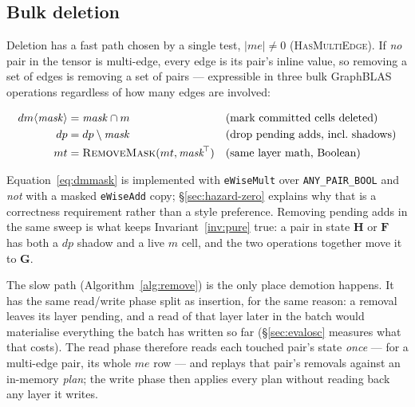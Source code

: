\documentclass[11pt,a4paper]{article}
\theoremstyle{plain}
\theoremstyle{definition}
\theoremstyle{remark}
\begin{document}
\subsection{Bulk deletion}
\label{sec:delete}

Deletion has a fast path chosen by a single test, $|me| \neq 0$
(\textsc{HasMultiEdge}). If \emph{no} pair in the tensor is multi-edge, every
edge is its pair's inline value, so removing a set of edges is removing a set
of pairs --- expressible in three bulk GraphBLAS operations regardless of how
many edges are involved:

\begin{align}
  dm\langle \mathit{mask}\rangle &\mathrel{{=}} \mathit{mask} \cap m
    &&\text{(mark committed cells deleted)} \label{eq:dmmask}\\
  dp &\mathrel{{=}} dp \setminus \mathit{mask}
    &&\text{(drop pending adds, incl.\ shadows)} \notag\\
  mt &\mathrel{{=}} \text{\textsc{RemoveMask}}(mt, \mathit{mask}^{\!\top})
    &&\text{(same layer math, Boolean)} \notag
\end{align}

Equation~\eqref{eq:dmmask} is implemented with \texttt{eWiseMult} over
\texttt{ANY\_PAIR\_BOOL} and \emph{not} with a masked \texttt{eWiseAdd} copy;
\S\ref{sec:hazard-zero} explains why that is a correctness requirement rather
than a style preference. Removing pending adds in the same sweep is what
keeps Invariant~\ref{inv:pure} true: a pair in state $\mathbf{H}$ or
$\mathbf{F}$ has both a $dp$ shadow and a live $m$ cell, and the two
operations together move it to $\mathbf{G}$.

The slow path (Algorithm~\ref{alg:remove}) is the only place demotion happens.
It has the same read/write phase split as insertion, for the same reason: a
removal leaves its layer pending, and a read of that layer later in the batch
would materialise everything the batch has written so far
(\S\ref{sec:evalosc} measures what that costs). The read phase therefore reads
each touched pair's state \emph{once} --- for a multi-edge pair, its whole $me$
row --- and replays that pair's removals against an in-memory \emph{plan}; the
write phase then applies every plan without reading back any layer it writes.
\end{document}
